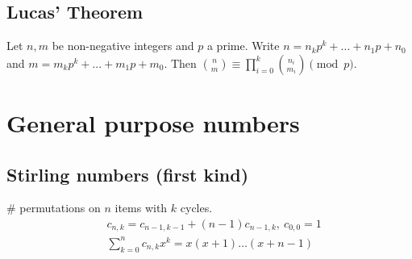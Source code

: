 	\subsection{Lucas' Theorem}
		Let $n,m$ be non-negative integers and $p$ a prime. Write $n=n_kp^k+...+n_1p+n_0$ and $m=m_kp^k+...+m_1p+m_0$. Then $\binom{n}{m} \equiv \prod_{i=0}^k\binom{n_i}{m_i} \pmod{p}$.


\section{General purpose numbers}


	\subsection{Stirling numbers (first kind)}
		\# permutations on $n$ items with $k$ cycles.
		\begin{align*}
			&c_{n,k} = c_{n-1,k-1} + (n-1) c_{n-1,k},\ c_{0,0} = 1 \\
			&\textstyle \sum_{k=0}^n c_{n,k}x^k = x(x+1) \dots (x+n-1)
		\end{align*}

